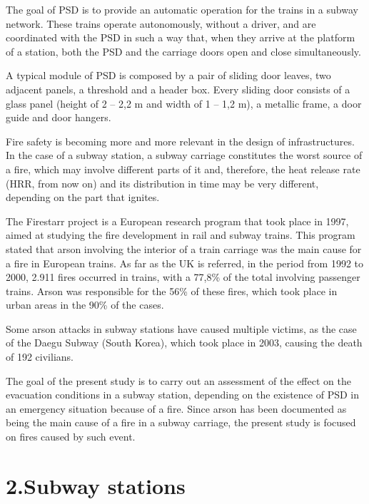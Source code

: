\documentclass{article}
\begin{document}
\noindent{}The goal of PSD is to provide an automatic operation for the trains in a subway network. These trains operate 
autonomously, without a driver, and are coordinated with the PSD in such a way that, when they arrive at the 
platform of a station, both the PSD and the carriage doors open and close simultaneously.%

A typical module of PSD is composed by a pair of sliding door leaves, two adjacent panels, a threshold and a 
header box. Every sliding door consists of a glass panel (height of 2 – 2,2 m and 
width of 1 – 1,2 m), a metallic frame, a door guide and door hangers.%

Fire safety is becoming more and more relevant in the design of infrastructures. In the case of a subway station, 
a subway carriage constitutes the worst source of a fire, which may involve different parts of it and, therefore, 
the heat release rate (HRR, from now on) and its distribution in time may be very different, depending on the part that ignites.%

The Firestarr project is a European research program that took place in 1997, aimed at studying the fire development 
in rail and subway trains. This program stated that arson involving the interior of a train carriage was the main cause 
for a fire in European trains. As far as the UK is referred, in the period from 1992 to 2000, 2.911 fires occurred in trains, 
with a 77,8\% of the total involving passenger trains. Arson was responsible for the 56\% of these fires, which took place in 
urban areas in the 90\% of the cases.%

Some arson attacks in subway stations have caused multiple victims, as the case of the Daegu Subway (South Korea), which took 
place in 2003, causing the death of 192 civilians.%

The goal of the present study is to carry out an assessment of the effect on the evacuation conditions in a subway station, 
depending on the existence of PSD in an emergency situation because of a fire. Since arson has been documented as being the 
main cause of a fire in a subway carriage, the present study is focused on fires caused by such event.%

\section{2.\hspace*{0.5em}Subway stations}\label{sec-subway-stations}%
\end{document}
